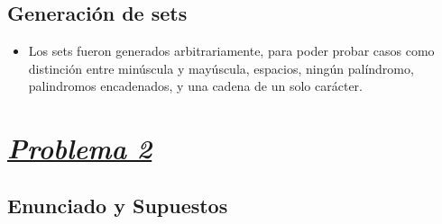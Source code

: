 \documentclass[a4paper, 12pt]{article}
\begin{document}
\subsection{Generación de sets}
\begin{itemize}
    \item Los sets fueron generados arbitrariamente, para poder probar casos como distinción entre minúscula y mayúscula, espacios, ningún palíndromo, palindromos encadenados, y una cadena de un solo carácter.
\end{itemize}

\newpage
\section{{\uline{\textbf{\textit{Problema 2}}}}}
\subsection{Enunciado y Supuestos}
\end{document}
